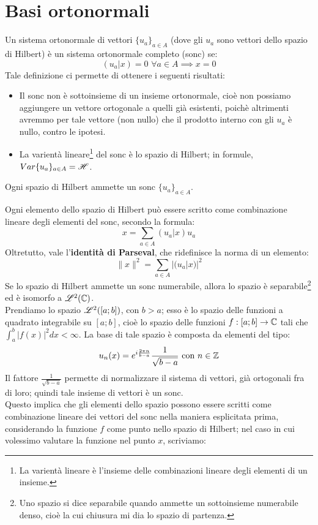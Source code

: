 \section{Basi ortonormali}
Un sistema ortonormale di vettori $\{u_a\}_{a \in A}$ (dove gli $u_a$ sono vettori dello spazio di Hilbert) è un sistema ortonormale completo (sonc) se:
$$(u_a|x)=0 \, \, \forall a \in A \implies x=0$$
Tale definizione ci permette di ottenere i seguenti risultati:
\begin{itemize}
\item Il sonc non è sottoinsieme  di un insieme ortonormale, cioè non possiamo aggiungere un vettore ortogonale a quelli già esistenti, poichè altrimenti avremmo per tale vettore (non nullo) che il prodotto interno con gli $u_a$ è nullo, contro le ipotesi.
\item La varientà lineare\footnote{La varientà lineare è l'insieme delle combinazioni lineare degli elementi di un insieme.} del sonc è lo spazio di Hilbert; in formule, $Var\{u_a\}_{a \in A}=\mathscr{H}$.
\end{itemize}
\begin{teorema}
Ogni spazio di Hilbert ammette un sonc $\{u_a\}_{a \in A}$.
\end{teorema}
Ogni elemento dello spazio di Hilbert può essere scritto come combinazione lineare degli elementi del sonc, secondo la formula:
$$x=\sum_{a \in A} (u_a|x)u_a$$
Oltretutto, vale l'\textbf{identità di Parseval}, che ridefinisce la norma di un elemento:
$$\|x\|^2 = \sum_{a \in A} |(u_a|x)|^2$$
Se lo spazio di Hilbert ammette un sonc numerabile, allora lo spazio è separabile\footnote{Uno spazio si dice separabile quando ammette un sottoinsieme numerabile denso, cioè la cui chiusura mi dia lo spazio di partenza.} ed è isomorfo a $\mathscr{L}^2(\mathbb{C})$.\\
Prendiamo lo spazio $\mathscr{L}^2([a;b])$, con $b>a$; esso è lo spazio delle funzioni a quadrato integrabile su $[a;b]$, cioè lo spazio delle funzioni $f:[a;b] \to \mathbb{C}$ tali che $\int_a ^b |f(x)|^2 dx < \infty$. La base di tale spazio è composta da elementi del tipo:
$$u_n(x)= e^{i \frac{2 \pi n}{b-a}} \frac{1}{\sqrt{b-a}} \text{ con } n \in \mathbb{Z}$$
Il fattore $ \frac{1}{\sqrt{b-a}}$ permette di normalizzare il sistema di vettori, già ortogonali fra di loro; quindi tale insieme di vettori è un sonc.\\
Questo implica che gli elementi dello spazio possono essere scritti come combinazione lineare dei vettori del sonc nella maniera esplicitata prima, considerando la funzione $f$ come punto nello spazio di Hilbert; nel caso in cui volessimo valutare la funzione nel punto $x$, scriviamo:
